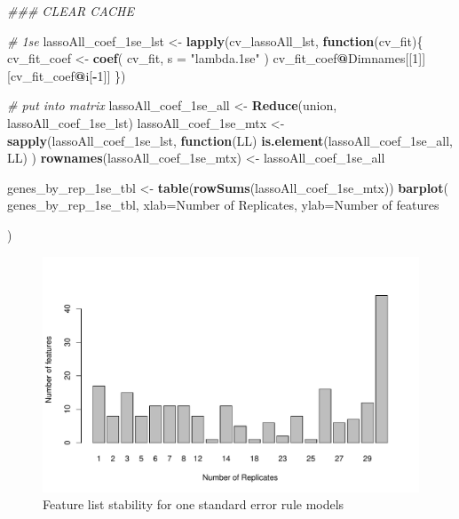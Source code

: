 \documentclass[
]{book}
\newenvironment{Shaded}{\begin{snugshade}}{\end{snugshade}}
\newcommand{\CommentTok}[1]{\textcolor[rgb]{0.56,0.35,0.01}{\textit{#1}}}
\newcommand{\ControlFlowTok}[1]{\textcolor[rgb]{0.13,0.29,0.53}{\textbf{#1}}}
\newcommand{\DataTypeTok}[1]{\textcolor[rgb]{0.13,0.29,0.53}{#1}}
\newcommand{\DecValTok}[1]{\textcolor[rgb]{0.00,0.00,0.81}{#1}}
\newcommand{\KeywordTok}[1]{\textcolor[rgb]{0.13,0.29,0.53}{\textbf{#1}}}
\newcommand{\NormalTok}[1]{#1}
\newcommand{\OperatorTok}[1]{\textcolor[rgb]{0.81,0.36,0.00}{\textbf{#1}}}
\newcommand{\StringTok}[1]{\textcolor[rgb]{0.31,0.60,0.02}{#1}}
\begin{document}
\begin{Shaded}
\begin{Highlighting}[]
\CommentTok{\#\#\# CLEAR CACHE}


\CommentTok{\# 1se}
\NormalTok{lassoAll\_coef\_1se\_lst <{-}}\StringTok{ }\KeywordTok{lapply}\NormalTok{(cv\_lassoAll\_lst, }\ControlFlowTok{function}\NormalTok{(cv\_fit)\{}
\NormalTok{ cv\_fit\_coef <{-}}\StringTok{ }\KeywordTok{coef}\NormalTok{(}
\NormalTok{ cv\_fit,}
 \DataTypeTok{s =} \StringTok{"lambda.1se"}
\NormalTok{ )}
\NormalTok{ cv\_fit\_coef}\OperatorTok{@}\NormalTok{Dimnames[[}\DecValTok{1}\NormalTok{]][cv\_fit\_coef}\OperatorTok{@}\NormalTok{i[}\OperatorTok{{-}}\DecValTok{1}\NormalTok{]]}
\NormalTok{ \})}

\CommentTok{\# put into matrix}
\NormalTok{lassoAll\_coef\_1se\_all <{-}}\StringTok{ }\KeywordTok{Reduce}\NormalTok{(union, lassoAll\_coef\_1se\_lst)}
\NormalTok{lassoAll\_coef\_1se\_mtx <{-}}\StringTok{ }\KeywordTok{sapply}\NormalTok{(lassoAll\_coef\_1se\_lst, }
  \ControlFlowTok{function}\NormalTok{(LL) }\KeywordTok{is.element}\NormalTok{(lassoAll\_coef\_1se\_all, LL)}
\NormalTok{)}
\KeywordTok{rownames}\NormalTok{(lassoAll\_coef\_1se\_mtx) <{-}}\StringTok{ }\NormalTok{lassoAll\_coef\_1se\_all}

\NormalTok{genes\_by\_rep\_1se\_tbl <{-}}\StringTok{ }\KeywordTok{table}\NormalTok{(}\KeywordTok{rowSums}\NormalTok{(lassoAll\_coef\_1se\_mtx))}
\KeywordTok{barplot}\NormalTok{(}
\NormalTok{ genes\_by\_rep\_1se\_tbl,}
 \DataTypeTok{xlab=}\StringTok{\textquotesingle{}Number of Replicates\textquotesingle{}}\NormalTok{,}
 \DataTypeTok{ylab=}\StringTok{\textquotesingle{}Number of features\textquotesingle{}}

\NormalTok{)}
\end{Highlighting}
\end{Shaded}

\begin{figure}
\centering
\includegraphics{Static/figures/feature-list-1se-1.pdf}
\caption{\label{fig:feature-list-1se}Feature list stability for one standard error rule models}
\end{figure}
\end{document}
